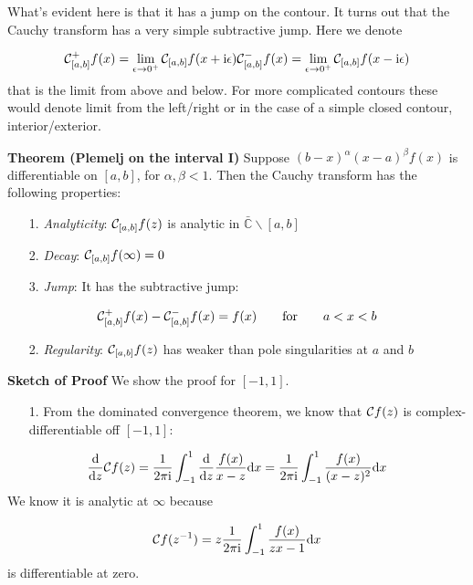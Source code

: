 \documentclass[12pt,a4paper]{article}
\def\qqfor{\qquad\hbox{for}\qquad}
\def\D{ {\rm d} }
\def\I{ {\rm i} }
\def\C{ {\mathbb C} }
\def\CC{ {\cal C} }
\def\qqfor{\qquad\hbox{for}\qquad}
\def\dx{\D x}
\begin{document}
What's evident here is that it has a jump on the contour.  It turns out that the Cauchy transform has a very simple subtractive jump. Here we denote

\[
    \CC_{[a,b]}^+ f(x) = \lim_{\epsilon \rightarrow 0^+} \CC_{[a,b]} f( x+ \I \epsilon)\\
        \CC_{[a,b]}^- f(x) = \lim_{\epsilon \rightarrow 0^+} \CC_{[a,b]} f( x- \I \epsilon)
\]
that is the limit from above and below. For more complicated contours these would denote limit from the left/right or in the case of a simple closed contour, interior/exterior. 

\textbf{Theorem (Plemelj on the interval I)} Suppose $(b-x)^\alpha (x-a)^\beta f(x)$ is differentiable  on $[a,b]$, for $\alpha, \beta < 1$.  Then the Cauchy transform has the following properties:

\begin{itemize}
\item[1. ] \emph{Analyticity}: $\CC_{[a,b]} f(z)$ is analytic in $\bar \C \backslash [a,b]$


\item[2. ] \emph{Decay}: $\CC_{[a,b]} f(\infty) = 0$


\item[3. ] \emph{Jump}: It has the subtractive jump:

\end{itemize}
\[
\CC_{[a,b]}^+ f(x) - \CC_{[a,b]}^- f(x) = f(x) \qqfor a < x < b
\]
\begin{itemize}
\item[2. ] \emph{Regularity}: $\CC_{[a,b]} f(z)$ has weaker than pole singularities at $a$ and $b$

\end{itemize}
\textbf{Sketch of Proof}  We show the proof for $[-1,1]$.

\begin{itemize}
\item[1. ] From the dominated convergence theorem, we know that $\CC f(z)$ is complex-differentiable off $[-1,1]$:

\end{itemize}
\[
{\D \over \D z} {\cal C} f(z) = {1 \over 2 \pi \I}\int_{-1}^1  {\D \over \D z} {f(x) \over x - z} \dx = {1 \over 2 \pi \I}\int_{-1}^1   {f(x) \over (x - z)^2} \dx
\]
We know it is analytic at $\infty$ because

\[
{\cal C} f(z^{-1}) = z {1 \over 2 \pi \I}\int_{-1}^1   {f(x) \over z x - 1} \dx
\]
is differentiable at zero. 
\end{document}
